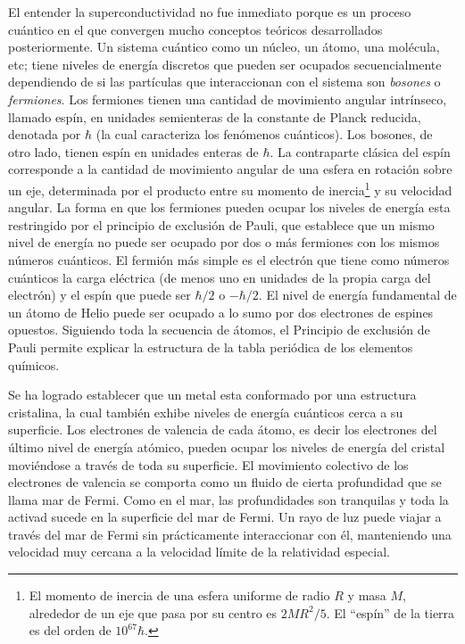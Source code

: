 El entender la superconductividad no fue inmediato porque es un proceso cuántico en el que convergen mucho conceptos teóricos desarrollados posteriormente. Un sistema cuántico como un núcleo, un átomo, una molécula, etc; tiene niveles de energía discretos que pueden ser ocupados secuencialmente dependiendo de si las partículas que interaccionan con el sistema son \emph{bosones} o \emph{fermiones}.  Los fermiones tienen una cantidad de movimiento angular intrínseco, llamado espín, en unidades semienteras de la constante de Planck reducida, denotada por $\hbar$ (la cual caracteriza los fenómenos cuánticos). Los bosones, de otro lado, tienen espín en unidades enteras de $\hbar$. La contraparte clásica del espín corresponde a la cantidad de movimiento angular de una esfera en rotación sobre un eje, determinada por el producto entre su momento de inercia\footnote{El momento de inercia de una esfera uniforme de radio $R$ y masa $M$, alrededor de un eje que pasa por su centro es $2MR^2/5$. El ``espín'' de la tierra es del orden de $10^{67}\hbar$.} y su velocidad angular. La forma en que los fermiones pueden ocupar los niveles de energía esta restringido por el principio de exclusión de Pauli, que establece que un mismo nivel de energía no puede ser ocupado por dos o más fermiones con los mismos números cuánticos. El fermión más simple es el electrón que tiene como números cuánticos la carga eléctrica (de menos uno en unidades de la propia carga del electrón) y el espín que puede ser $\hbar/2$ o $-\hbar/2$. El nivel de energía fundamental de un átomo de Helio puede ser ocupado a lo sumo por dos electrones de espines opuestos. Siguiendo toda la secuencia de átomos,  el Principio de exclusión de Pauli permite explicar la estructura de la tabla periódica de los elementos químicos. 

Se ha logrado establecer que un metal esta conformado por una estructura cristalina, la cual también exhibe niveles de energía cuánticos cerca a su superficie. Los electrones de valencia  de cada átomo, es decir los electrones del último nivel de energía atómico, pueden ocupar los niveles de energía del cristal moviéndose a través de toda su superficie. El movimiento colectivo de los electrones de valencia se comporta como un fluido de cierta profundidad que se llama mar de Fermi. Como en el mar, las profundidades son tranquilas y toda la activad sucede en la superficie del mar de Fermi. Un rayo de luz puede viajar a través del mar de Fermi sin prácticamente interaccionar con él, manteniendo una velocidad muy cercana a la velocidad límite de la relatividad especial.

